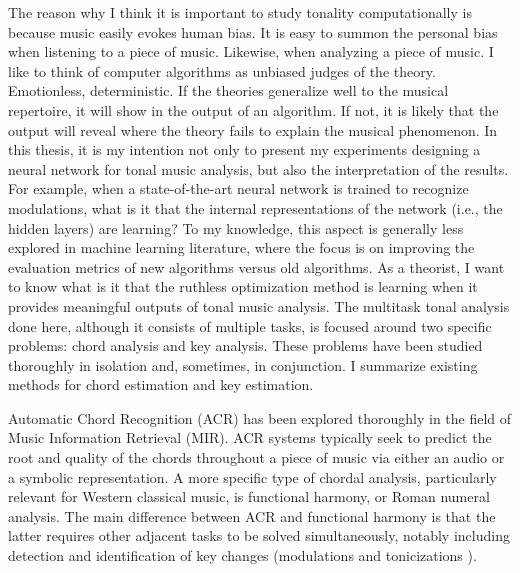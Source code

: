 The reason why I think it is important to study tonality
computationally is because music easily evokes human bias.
It is easy to summon the personal bias when listening to a
piece of music. Likewise, when analyzing a piece of music. I
like to think of computer algorithms as unbiased judges of
the theory. Emotionless, deterministic. If the theories
generalize well to the musical repertoire, it will show in
the output of an algorithm. If not, it is likely that the
output will reveal where the theory fails to explain the
musical phenomenon. In this thesis, it is my intention not
only to present my experiments designing a neural network
for tonal music analysis, but also the interpretation of the
results. For example, when a state-of-the-art neural network
is trained to recognize modulations, what is it that the
internal representations of the network (i.e., the hidden
layers) are learning? To my knowledge, this aspect is
generally less explored in machine learning literature,
where the focus is on improving the evaluation metrics of
new algorithms versus old algorithms. As a theorist, I want
to know what is it that the ruthless optimization method is
learning when it provides meaningful outputs of tonal music
analysis. The multitask tonal analysis done here, although
it consists of multiple tasks, is focused around two
specific problems: chord analysis and key analysis. These
problems have been studied thoroughly in isolation and,
sometimes, in conjunction. I summarize existing methods for
chord estimation and key estimation.

Automatic Chord Recognition (ACR) has been explored
thoroughly in the field of Music Information Retrieval
(MIR). ACR systems typically seek to predict the root and
quality of the chords throughout a piece of music via either
an audio or a symbolic representation. A more specific type
of chordal analysis, particularly relevant for Western
classical music, is functional harmony, or Roman numeral
analysis. The main difference between ACR and functional
harmony is that the latter requires other adjacent tasks to
be solved simultaneously, notably including detection and
identification of key changes (modulations
\cite{feisthauer_estimating_2020, schreiber_local_2020} and
tonicizations \cite{napoles_lopez_local_2020}).


